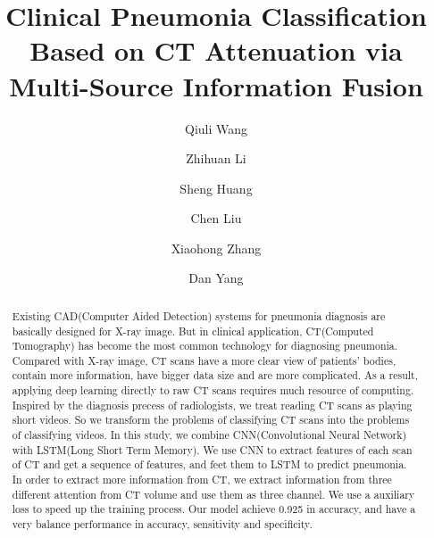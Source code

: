 \documentclass[runningheads]{llncs}
\begin{document}
%
\title{Clinical Pneumonia Classification Based on CT Attenuation via Multi-Source Information Fusion}
%
%
\author{Qiuli Wang\and
Zhihuan Li \and
Sheng Huang \and
Chen Liu\and
Xiaohong Zhang\and
Dan Yang 
}
%
%
%
\maketitle              %
%
\begin{abstract}
Existing CAD(Computer Aided Detection) systems for pneumonia diagnosis are basically designed for X-ray image. But in clinical application, CT(Computed Tomography) has become the most common technology for diagnosing pneumonia. Compared with X-ray image, CT scans have a more clear view of patients' bodies, contain more information, have bigger data size and are more complicated. As a result, applying deep learning directly to raw CT scans requires much resource of computing.
Inspired by the diagnosis precess of radiologists, we treat reading CT scans as playing short videos. So we transform the problems of classifying CT scans into the problems of classifying videos.
In this study, we combine  CNN(Convolutional Neural Network) with LSTM(Long Short Term Memory).
We use CNN to extract features of each scan of CT and get a sequence of features, and feet them to LSTM to predict pneumonia.  In order to extract more information from CT, we extract information from three different attention from CT volume and use them as three channel.
We use a auxiliary loss to speed up the training process. 
Our model achieve 0.925 in accuracy, and have a very balance performance in accuracy, sensitivity and specificity.


\end{abstract}
\end{document}
